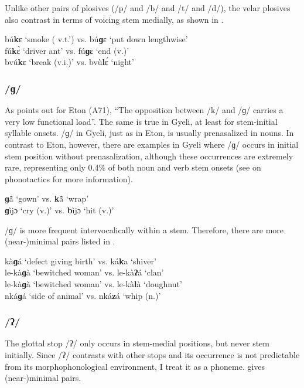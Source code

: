 \noindent Unlike other pairs of plosives (/p/ and /b/ and /t/ and /d/), the velar plosives also contrast in terms of voicing stem medially, as shown in .

\ea \label{km}
bú{\bfseries k}ɛ `smoke ( v.t.') vs. bú{\bfseries ɡ}ɛ `put down lengthwise' \\
fú{\bfseries k}ɛ̀ `driver ant' vs. fú{\bfseries ɡ}ɛ `end (v.)' \\
bvú{\bfseries k}ɛ `break (v.i.)' vs. bvù{\bfseries l}ɛ́ `night'
\z


\subsubsection*{\bfseries /ɡ/} As \citet[10]{velde2008} points out for Eton (A71), ``The opposition between /k/ and /ɡ/ carries a very low functional load''. The same is true in Gyeli, at least for stem-initial syllable onsets. /ɡ/ in Gyeli, just as in Eton, is usually prenasalized in nouns. In contrast to Eton, however, there are examples in Gyeli where /ɡ/ occurs in initial stem position without prenasalization, although these occurrences are extremely rare, representing only 0.4\% of both noun and verb stem onsets (see  on phonotactics for more information).


\ea \label{g}
{\bfseries ɡ}ã̂ `gown' vs. {\bfseries k}ã̂ `wrap' \\
{\bfseries ɡ}ìjɔ `cry (v.)' vs. {\bfseries b}ìjɔ `hit (v.)'
\z

\noindent /ɡ/ is more frequent intervocalically within a stem. Therefore, there are more (near-)minimal pairs listed in .

\ea \label{gm}
kà{\bfseries ɡ}á `defect giving birth' vs. ká{\bfseries k}a `shiver' \\
le-kà{\bfseries ɡ}à `bewitched woman' vs. le-kà{\bfseries ʔ}á `clan' \\
le-kà{\bfseries ɡ}à `bewitched woman' vs. le-kà{\bfseries l}à `doughnut' \\
nká{\bfseries ɡ}á `side of animal' vs. nká{\bfseries z}á `whip (n.)' 
\z



\subsubsection*{\bfseries /ʔ/} The glottal stop /ʔ/ only occurs in stem-medial positions, but never stem initially. Since /ʔ/ contrasts with other stops and its occurrence is not predictable from its morphophonological environment, I treat it as a phoneme.  gives (near-)minimal pairs.

